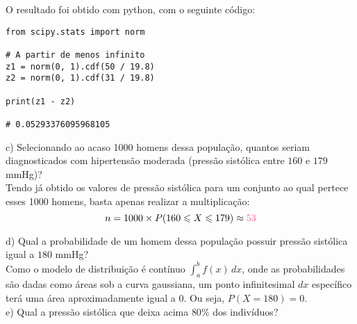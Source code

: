 O resultado foi obtido com python, com o seguinte código:\\

\begin{lstlisting}
from scipy.stats import norm

# A partir de menos infinito
z1 = norm(0, 1).cdf(50 / 19.8)
z2 = norm(0, 1).cdf(31 / 19.8)
    
print(z1 - z2)
    
# 0.05293376095968105
\end{lstlisting}

c)  Selecionando ao acaso 1000 homens dessa população, quantos seriam diagnosticados com hipertensão moderada (pressão sistólica entre $160$ e $179$ mmHg)?\\

Tendo já obtido os valores de pressão sistólica para um conjunto ao qual pertece esses 1000 homens, basta apenas realizar a multiplicação:
\\

\[
    n=1000\times P(160\leqslant X\leqslant 179) \approx \textcolor{COLOR2}{53}
\]

d) Qual a probabilidade de um homem dessa população possuir pressão sistólica igual a $180$ mmHg?\\

Como o modelo de distribuição é contínuo $\int_{a}^{b} f(x)\,dx $, onde as probabilidades são dadas como áreas sob a curva gaussiana, um ponto infinitesimal $dx$ específico terá uma área aproximadamente igual a 0. Ou seja, \textcolor{COLOR2}{$P(X=180)=0$}. \\

e) Qual a pressão sistólica que deixa acima $80\%$ dos indivíduos?\\



